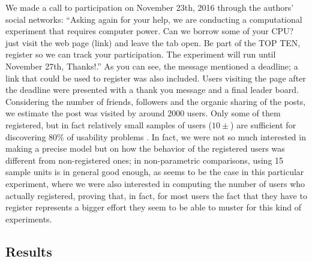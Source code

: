 \documentclass{llncs}
\begin{document}
We made a call to participation on November 23th,
2016 through the authors' social networks: ``Asking again for your help, we are conducting a computational experiment
that requires computer power. Can we borrow some of your CPU? just visit the web page (link)
and leave the tab open. Be part of the TOP TEN, register so we can track your participation.
The experiment will run until November 27th, Thanks!.'' As you can
see, the message mentioned a deadline; a link that could be used to
register was also included. Users visiting the page after the deadline
were presented with a thank you message and a final leader
board. Considering the number of friends, followers and the organic
sharing of the posts, we estimate the post was visited by around 2000
users. Only some of them registered, but in fact relatively small samples of users ($10\pm$) are sufficient for
discovering 80\% of usability problems \cite{Schmettow2012}. In fact,
we were not so much interested in making a precise model but on how
the behavior of the registered users was different from non-registered
ones; in non-parametric comparisons, using 15 sample units is in general
good enough, as seems to be the case in this particular
experiment, where we were also interested in computing the number of
users who actually registered, proving that, in fact, for most users
the fact that they have to register represents a bigger effort they
seem to be able to muster for this kind of experiments. 


\subsection{Results}
\label{sec:results}
\end{document}
